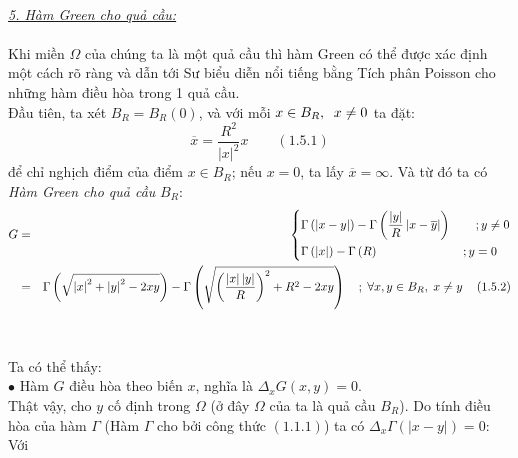 \\ \textit{\underline{5. Hàm Green cho quả cầu:} }\\
\\ Khi miền $\Omega$ của chúng ta là một quả cầu thì hàm Green có thể được xác định một cách rõ ràng và dẫn tới Sư biểu diễn nổi tiếng bằng Tích phân Poisson cho những hàm điều hòa trong 1 quả cầu.\\
Đầu tiên, ta xét $
B_R  = B_R \left( 0 \right)
$, và với mỗi $
x \in B_R ,{\kern 1pt} \,\;x \ne 0
$ ta đặt:
\[
\overline x  = \frac{{R^2 }}
{{\left| x \right|^2 }}x\quad \quad \left( {1.5.1} \right)
\]
để chỉ nghịch điểm của điểm $
x \in B_R $; nếu $x=0$, ta lấy $
\overline x  = \infty 
$. Và từ đó ta có {\it Hàm Green cho quả cầu} $B_R$:
\begin{eqnarray}
G &=& \left\{ \begin{gathered}
  \Gamma \left( {\left| {x - y} \right|} \right) - \Gamma \left( {\frac{{\left| y \right|}}
{R}\left| {x - \overline y } \right|} \right)\quad \quad ;y \ne 0 \hfill \\
  \Gamma \left( {\left| x \right|} \right) - \Gamma \left( R \right)\quad \quad \quad \quad \quad \quad \quad ;y = 0 \hfill \\ 
\end{gathered}  \right.\nonumber \\
 &=& \Gamma \left( {\sqrt {\left| x \right|^2  + \left| y \right|^2  - 2xy} } \right) - \Gamma \left( {\sqrt {\left( {\frac{{\left| x \right|\left| y \right|}}
{R}} \right)^2  + R^2  - 2xy} } \right)\quad ;\;\forall x,y \in B_R ,\;x \ne y\quad \left( {1.5.2} \right)\nonumber
\end{eqnarray}
\\ \\Ta có thể thấy:\\
$\bullet$ Hàm $G$ điều hòa theo biến $x$, nghĩa là $
\Delta _x G\left( {x,y} \right) = 0
$.
\\Thật vậy, cho $y$ cố định trong $\Omega$ (ở đây $\Omega$ của ta là quả cầu $B_R$). Do tính điều hòa của hàm $\Gamma$ (Hàm $\Gamma$ cho bởi công thức $
\left( {1.1.1} \right)
$) ta có $
\Delta _x \Gamma \left( {\left| {x - y} \right|} \right) = 0
$:\\
Với 
